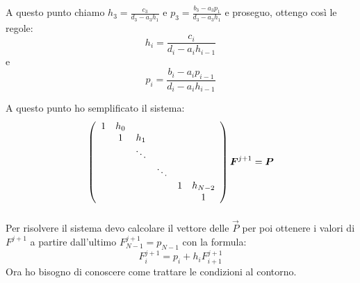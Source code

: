 A questo punto chiamo $h_3 = \frac{c_3}{d_3 -a_3 h_1}$ e $p_3=\frac{b_3-a_3p_1}{d_3 -a_3 h_1}$ e proseguo, ottengo cos\`i le regole:
\begin{equation}\label{eq:hi}
  h_i = \frac{c_i}{d_i -a_i h_{i-1}}
\end{equation}
e
\begin{equation}\label{eq:pi}
  p_i=\frac{b_i-a_ip_{i-1}}{d_i -a_i h_{i-1}}
\end{equation}

A questo punto ho semplificato il sistema:
\begin{equation}\end{equation}
$$\left( \begin{array}{cccccc}
    1	&h_0&	&	&	&\\
    &1	&h_1&	&	&\\
    &	&\ddots	&	&	&\\
    &	&	&\ddots	&	&\\
    &	&	&	&1	&h_{N-2}\\
    &	&	&	&	&1
\end{array} \right) \boldsymbol{F}^{j+1} = \boldsymbol{P}$$
\begin{equation}\end{equation}

Per risolvere il sistema devo calcolare il vettore delle $\vec{P}$ per poi ottenere i valori di $F^{j+1}$ a partire dall'ultimo $F_{N-1}^{j+1} = p_{N-1}$ con la formula:
\begin{equation}
  F_{i}^{j+1} = p_{i}+h_i F_{i+1}^{j+1}
\end{equation}
Ora ho bisogno di conoscere come trattare le condizioni al contorno.
